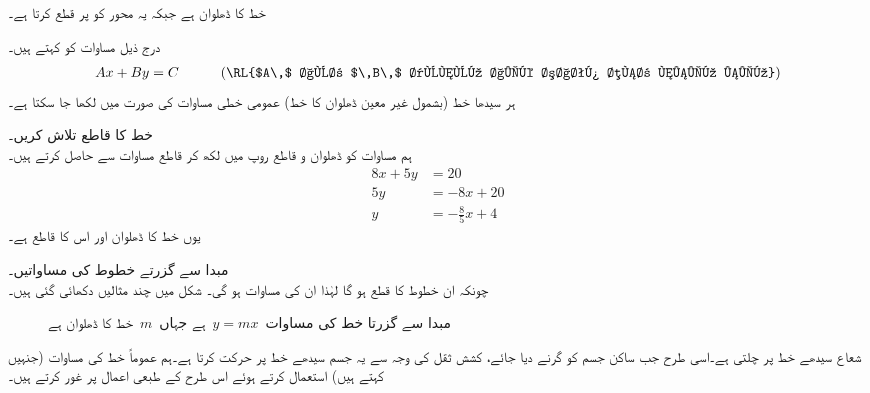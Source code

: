 خط  کا  ڈھلوان  ہے جبکہ یہ محور  کو  پر قطع کرتا ہے۔

درج ذیل مساوات کو  کہتے ہیں۔
\begin{align*}
Ax+By=C\quad\quad\quad (\text{\RL{$A\,$ اور $\,B\,$ دونوں ایک ساتھ صفر نہیں ہیں}})
\end{align*}
ہر سیدھا خط (بشمول غیر معین ڈھلوان کا خط)  عمومی خطی مساوات کی صورت میں لکھا جا سکتا ہے۔ 

خط  کا  قاطع   تلاش کریں۔\\
ہم مساوات کو ڈھلوان و قاطع روپ میں لکھ کر   قاطع    مساوات سے حاصل کرتے ہیں۔
\begin{align*}
8x+5y&=20\\
5y&=-8x+20\\
y&=-\frac{8}{5}x+4
\end{align*}
یوں خط کا  ڈھلوان  اور       اس کا    قاطع ہے۔

مبدا سے گزرتے خطوط کی مساواتیں۔\\
چونکہ ان خطوط کا  قطع  ہو گا لہٰذا ان کی مساوات  ہو گی۔ شکل  میں چند مثالیں دکھائی گئی ہیں۔
\begin{figure}
\centering
{}
\caption{مبدا سے گزرتا خط کی مساوات $\,y=mx\,$ ہے جہاں $\,m\,$ خط کا  ڈھلوان ہے}
\label{شکل_ابتدا_مبدا_گزرتا_خط}
\end{figure}

شعاع سیدھے خط پر چلتی ہے۔اسی طرح جب  ساکن جسم   کو گرنے دیا جائے، کشش ثقل کی  وجہ سے   یہ جسم سیدھے خط پر حرکت کرتا ہے۔ہم عموماً خط کی مساوات (جنہیں  کہتے ہیں) استعمال کرتے ہوئے اس طرح کے  طبعی اعمال پر غور کرتے ہیں۔ 

